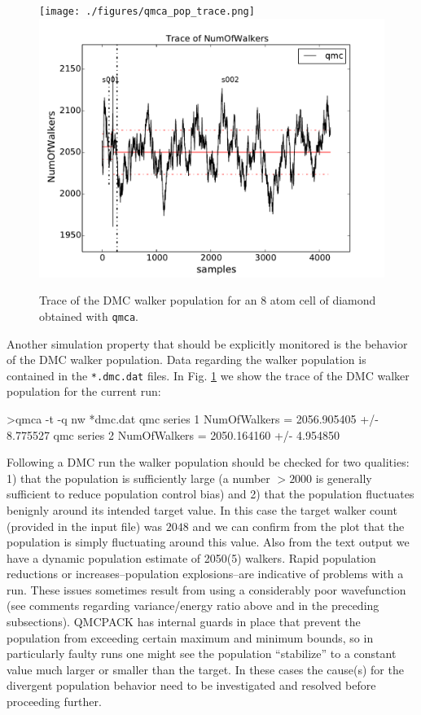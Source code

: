 \begin{figure}
\begin{center}
  \ifdefined\HCode
\texttt{[image: ./figures/qmca\_pop\_trace.png]}
\else
\includegraphics[trim = 0mm 0mm 0mm 0mm, clip,width=0.75\columnwidth]{./figures/qmca_pop_trace.pdf}
\fi
\end{center}
\caption{Trace of the DMC walker population for an 8 atom cell of diamond obtained with \texttt{qmca}.}
\label{fig:qmca_pop_trace}
\end{figure}

Another simulation property that should be explicitly monitored  
is the behavior of the DMC walker population.  Data regarding the 
walker population is contained in the \texttt{*.dmc.dat} files.
In Fig. \ref{fig:qmca_pop_trace} we show the trace of the DMC 
walker population for the current run:
\begin{shade}
>qmca -t -q nw *dmc.dat
qmc  series 1  NumOfWalkers          =  2056.905405 +/- 8.775527 
qmc  series 2  NumOfWalkers          =  2050.164160 +/- 4.954850 
\end{shade}
\noindent
Following a DMC run the walker population should be checked for 
two qualities: 1) that the population is sufficiently large (a number 
$>2000$ is generally sufficient to reduce population control bias) and  
2) that the population fluctuates benignly around its intended target 
value. In this case the target walker count (provided in the input file)
was $2048$ and we can confirm from the plot that the population is simply 
fluctuating around this value.  Also from the text output we have a dynamic 
population estimate of 2050(5) walkers.  Rapid population reductions or 
increases--population explosions--are indicative of problems with a run.  
These issues sometimes result from using a considerably poor wavefunction 
(see comments regarding variance/energy ratio above and in the preceding 
subsections).  QMCPACK has internal guards in place that prevent 
the population from exceeding certain maximum and minimum bounds, so 
in particularly faulty runs one might see the population ``stabilize'' 
to a constant value much larger or smaller than the target.  In these 
cases the cause(s) for the divergent population behavior need to 
be investigated and resolved before proceeding further.



